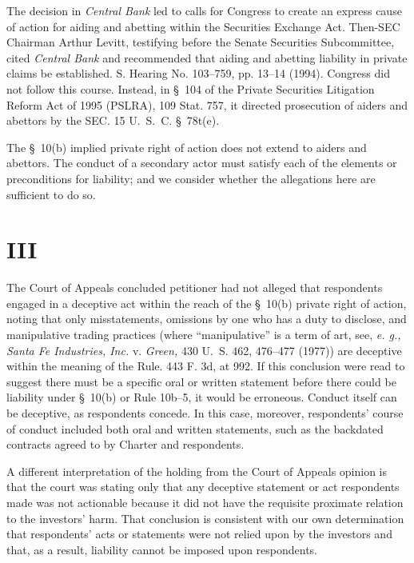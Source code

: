   The decision in \emph{Central Bank} led to calls for Congress to create an express cause of action for aiding and abetting within the Securities Exchange Act. Then-SEC Chairman Arthur Levitt, testifying before the Senate Securities Subcommittee, cited \emph{Central Bank} and recommended that aiding and abetting liability in private claims be established. S. Hearing No. 103--759, pp. 13--14 (1994). Congress did not follow this course. Instead, in \S~104 of the Private Securities Litigation Reform Act of 1995 (PSLRA), 109 Stat. 757, it directed prosecution of aiders and abettors by the SEC. 15 U.~S.~C. \S~78t(e).

  The \S~10(b) implied private right of action does not extend to aiders and abettors. The conduct of a secondary actor must satisfy each of the elements or preconditions for liability; and we consider whether the allegations here are sufficient to do so.

\section{III}

  The Court of Appeals concluded petitioner had not alleged that respondents engaged in a deceptive act within the reach of the \S~10(b) private right of action, noting that only misstatements, omissions by one who has a duty to disclose, and manipulative trading practices (where ``manipulative'' is a term of art, see, \emph{e. g., Santa Fe Industries, Inc.} v. \emph{Green,} 430 U.~S. 462, 476--477 (1977)) are deceptive within the meaning of the Rule. 443 F. 3d, at 992. If this conclusion were read to suggest there must be a specific oral or written statement before there could be liability under \S~10(b) or Rule 10b--5, it would be erroneous. Conduct itself can be deceptive, as respondents concede. In this case, moreover, respondents' course of conduct included both oral and written statements, such as the backdated contracts agreed to by Charter and respondents.

  A different interpretation of the holding from the Court of Appeals opinion is that the court was stating only that any deceptive statement or act respondents made was not actionable because it did not have the requisite proximate relation \newpage  to the investors' harm. That conclusion is consistent with our own determination that respondents' acts or statements were not relied upon by the investors and that, as a result, liability cannot be imposed upon respondents.

